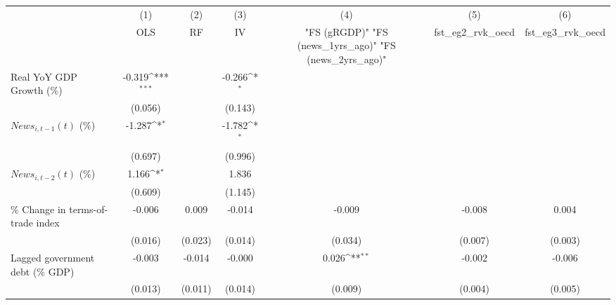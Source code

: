 {
\def\sym#1{\ifmmode^{#1}\else\(^{#1}\)\fi}
\begin{tabular}{l*{6}{c}}
\toprule
                    &\multicolumn{1}{c}{(1)}&\multicolumn{1}{c}{(2)}&\multicolumn{1}{c}{(3)}&\multicolumn{1}{c}{(4)}&\multicolumn{1}{c}{(5)}&\multicolumn{1}{c}{(6)}\\
                    &\multicolumn{1}{c}{OLS}&\multicolumn{1}{c}{RF}&\multicolumn{1}{c}{IV}&\multicolumn{1}{c}{ "FS (gRGDP)"  "FS (news_1yrs_ago)"  "FS (news_2yrs_ago)" }&\multicolumn{1}{c}{fst_eg2_rvk_oecd}&\multicolumn{1}{c}{fst_eg3_rvk_oecd}\\
\midrule
Real YoY GDP Growth (\%)&      -0.319\sym{***}&                     &      -0.266\sym{*}  &                     &                     &                     \\
                    &     (0.056)         &                     &     (0.143)         &                     &                     &                     \\
\addlinespace
$ News_{i,t-1}(t)$ (\%)&      -1.287\sym{*}  &                     &      -1.782\sym{*}  &                     &                     &                     \\
                    &     (0.697)         &                     &     (0.996)         &                     &                     &                     \\
\addlinespace
$ News_{i,t-2}(t)$ (\%)&       1.166\sym{*}  &                     &       1.836         &                     &                     &                     \\
                    &     (0.609)         &                     &     (1.145)         &                     &                     &                     \\
\addlinespace
\% Change in terms-of-trade index&      -0.006         &       0.009         &      -0.014         &      -0.009         &      -0.008         &       0.004         \\
                    &     (0.016)         &     (0.023)         &     (0.014)         &     (0.034)         &     (0.007)         &     (0.003)         \\
\addlinespace
Lagged government debt (\% GDP)&      -0.003         &      -0.014         &      -0.000         &       0.026\sym{**} &      -0.002         &      -0.006         \\
                    &     (0.013)         &     (0.011)         &     (0.014)         &     (0.009)         &     (0.004)         &     (0.005)         \\

\end{tabular}}
